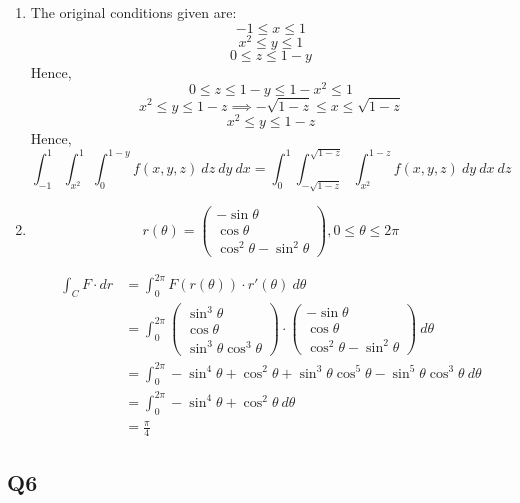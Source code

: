 \documentclass{article}
\begin{document}
\begin{enumerate}[label=(\alph*)]
\item
The original conditions given are:
\[-1 \leq x \leq 1\]
\[x^2 \leq y \leq 1\]
\[0 \leq z \leq 1-y\]
Hence,
\[0\leq z\leq 1-y \leq 1-x^2 \leq 1\]
\[x^2 \leq y \leq 1-z \implies -\sqrt{1-z} \leq x \leq \sqrt{1-z}\]
\[x^2 \leq y \leq 1-z\]
Hence,
\[
\int_{-1}^1 \int_{x^2}^1 \int_0^{1-y} f(x,y,z)\ dz\ dy\ dx
= \int_{0}^1 \int_{-\sqrt{1-z}}^{\sqrt{1-z}} \int_{x^2}^{1-z} f(x,y,z)\ dy\ dx\ dz
\]

\item
\[
r(\theta) = \begin{pmatrix}
-\sin \theta\\\cos\theta\\\cos^2 \theta-\sin^2 \theta
\end{pmatrix}, 0\leq \theta \leq 2\pi
\]

\begin{align*}
\int_C F\cdot dr &= \int_0^{2\pi} F(r(\theta))\cdot r'(\theta)\ d\theta \\
&= \int_0^{2\pi} \begin{pmatrix}
\sin^3 \theta\\\cos\theta\\\sin^3\theta\cos^3\theta
\end{pmatrix}\cdot \begin{pmatrix}
-\sin \theta\\\cos\theta\\\cos^2 \theta-\sin^2 \theta
\end{pmatrix}\ d\theta \\
&= \int_0^{2\pi} -\sin^4 \theta + \cos^2\theta + \sin^3\theta\cos^5\theta - \sin^5\theta\cos^3\theta\ d\theta \\
&= \int_0^{2\pi} -\sin^4 \theta + \cos^2\theta \ d\theta \\
&= \frac{\pi}{4}
\end{align*}
\end{enumerate}

\subsection*{Q6}
\end{document}

